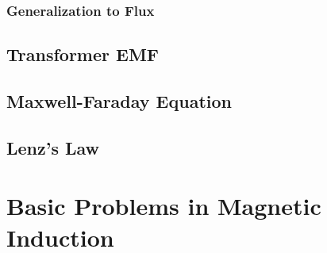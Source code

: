 \documentclass[class=article, crop=false, 12pt]{standalone}
\begin{document}
\subsubsection{Generalization to Flux}

\subsection{Transformer EMF}

\subsection{Maxwell-Faraday Equation}

\subsection{Lenz's Law}


\linesep
\section{Basic Problems in Magnetic Induction}


\theend
\end{document}
